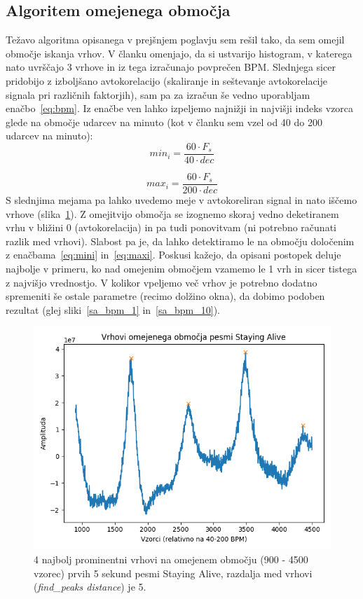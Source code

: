 \documentclass[a4paper,11pt]{article}
\begin{document}
\subsection{Algoritem omejenega območja}

Težavo algoritma opisanega v prejšnjem poglavju sem rešil tako, da sem omejil območje iskanja vrhov. V članku omenjajo, da si ustvarijo histogram, v katerega nato uvrščajo 3 vrhove in iz tega izračunajo povprečen BPM. Slednjega sicer pridobijo z izboljšano avtokorelacijo (skaliranje in seštevanje avtokorelacije signala pri različnih faktorjih), sam pa za izračun še vedno uporabljam enačbo~\ref{eq:bpm}. Iz enačbe ven lahko izpeljemo najnižji in najvišji indeks vzorca glede na območje udarcev na minuto (kot v članku sem vzel od 40 do 200 udarcev na minuto):
\begin{equation} \label{eq:mini}
min_{i} = \frac{60 \cdot F_s}{40 \cdot dec}
\end{equation}

\begin{equation} \label{eq:maxi}
max_{i} = \frac{60 \cdot F_s}{200 \cdot dec}
\end{equation}
S slednjima mejama pa lahko uvedemo meje v avtokoreliran signal in nato iščemo vrhove (slika~\ref{sa_peaks_new}). Z omejitvijo območja se izognemo skoraj vedno deketiranem vrhu v bližini 0 (avtokorelacija) in pa tudi ponovitvam (ni potrebno računati razlik med vrhovi). Slabost pa je, da lahko detektiramo le na območju določenim z enačbama~\ref{eq:mini} in~\ref{eq:maxi}. Poskusi kažejo, da opisani postopek deluje najbolje v primeru, ko nad omejenim območjem vzamemo le 1 vrh in sicer tistega z najvišjo vrednostjo. V kolikor vpeljemo več vrhov je potrebno dodatno spremeniti še ostale parametre (recimo dolžino okna), da dobimo podoben rezultat (glej sliki~\ref{sa_bpm_1} in~\ref{sa_bpm_10}).

\begin{figure}[htbp]
\begin{center}
\includegraphics[scale=0.5]{images/sa_win0_dist5_prom4_new.png}
\caption{4 najbolj prominentni vrhovi na omejenem območju (900 - 4500 vzorec) prvih 5 sekund pesmi Staying Alive, razdalja med vrhovi (\textit{find\_peaks distance}) je 5.}
\label{sa_peaks_new}
\end{center}
\end{figure}
\end{document}
